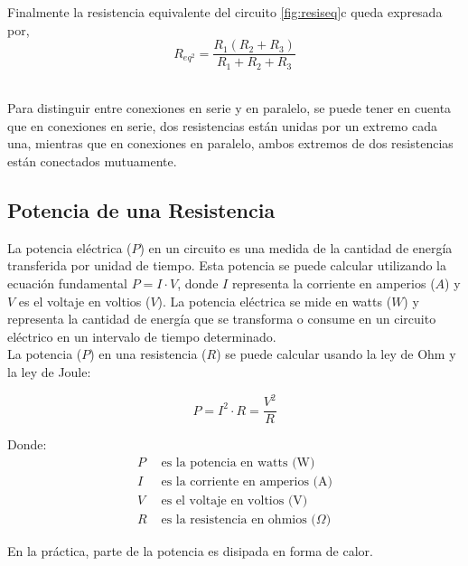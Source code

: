 \indent Finalmente la resistencia equivalente del circuito \ref{fig:resiseq}c queda expresada por,
\begin{equation*}
    R_{eq^2} = \frac{R_1(R_2 + R_3)}{R_1 + R_2 + R_3}
\end{equation*}
\\


\begin{remark}
    Para distinguir entre conexiones en serie y en paralelo, se puede tener en cuenta que en conexiones en serie, dos resistencias están unidas por un extremo cada una, mientras que en conexiones en paralelo, ambos extremos de dos resistencias están conectados mutuamente.
\end{remark}


\subsection{Potencia de una Resistencia}
La potencia eléctrica (\(P\)) en un circuito es una medida de la cantidad de energía transferida por unidad de tiempo. Esta potencia se puede calcular utilizando la ecuación fundamental \(P = I \cdot V\), donde \(I\) representa la corriente en amperios (\(A\)) y \(V\) es el voltaje en voltios (\(V\)). La potencia eléctrica se mide en watts (\(W\)) y representa la cantidad de energía que se transforma o consume en un circuito eléctrico en un intervalo de tiempo determinado. \\


La potencia (\(P\)) en una resistencia (\(R\)) se puede calcular usando la ley de Ohm y la ley de Joule:

\begin{equation*}
    P = I^2 \cdot R = \frac{V^2}{R}
\end{equation*}


Donde:
\begin{align*}
    P & \text{ es la potencia en watts (W)}              \\
    I & \text{ es la corriente en amperios (A)}          \\
    V & \text{ es el voltaje en voltios (V)}             \\
    R & \text{ es la resistencia en ohmios (\(\Omega\))}
\end{align*}

\begin{remark}
    En la práctica, parte de la potencia es disipada en forma de calor.
\end{remark}



